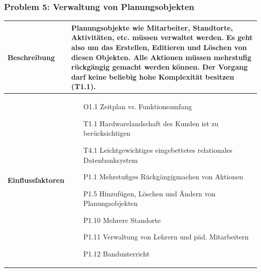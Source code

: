 \documentclass[fontsize=12pt,paper=a4,twoside]{scrartcl}
\begin{document}
\subsubsection{Problem 5: Verwaltung von Planungsobjekten}
\begin{tabularx}{\textwidth}{|p{6cm}|X|}
 \hline
 \textbf{Beschreibung} & Planungsobjekte wie Mitarbeiter, Standtorte, Aktivitäten, etc. müssen verwaltet werden. Es geht also um das Erstellen, Editieren und Löschen von diesen Objekten. Alle Aktionen müssen mehrstufig rückgängig gemacht werden können. Der Vorgang darf keine beliebig hohe Komplexität besitzen (T1.1).\\\hline
 \textbf{Einflussfaktoren} &
 \begin{itemize}
\item[O1.1] Zeitplan vs. Funktionsumfang
\item[T1.1] Hardwarelandschaft des Kunden ist zu berücksichtigen
\item[T4.1] Leichtgewichtiges eingebettetes relationales Datenbanksystem
\item[P1.1] Mehrstufiges Rückgängigmachen von Aktionen
\item[P1.5] Hinzufügen, Löschen und Ändern von Planungsobjekten
\item[P1.10] Mehrere Standorte
\item[P1.11] Verwaltung von Lehrern und päd. Mitarbeitern
\item[P1.12] Bandunterricht
 \end{itemize}\\\hline
\end{tabularx}
\end{document}
